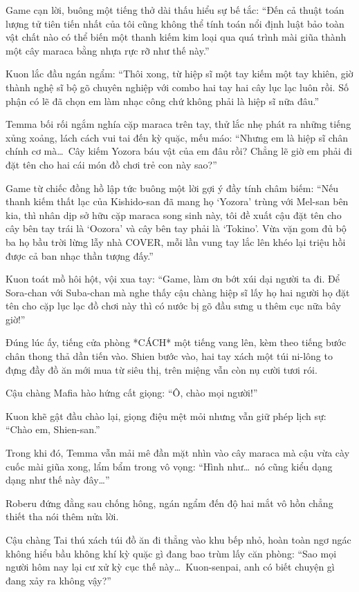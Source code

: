 \documentclass[../main.tex]{subfiles}
\begin{document}
Game cạn lời, buông một tiếng thở dài thấu hiểu sự bế tắc: ``Đến cả thuật toán lượng tử tiên tiến nhất của tôi cũng không thể tính toán nổi định luật bảo toàn vật chất nào có thể biến một thanh kiếm kim loại qua quá trình mài giũa thành một cây maraca bằng nhựa rực rỡ như thế này.''

Kuon lắc đầu ngán ngẩm: ``Thôi xong, từ hiệp sĩ một tay kiếm một tay khiên, giờ thành nghệ sĩ bộ gõ chuyên nghiệp với combo hai tay hai cây lục lạc luôn rồi. Số phận có lẽ đã chọn em làm nhạc công chứ không phải là hiệp sĩ nữa đâu.''

Temma bối rối ngắm nghía cặp maraca trên tay, thử lắc nhẹ phát ra những tiếng xủng xoảng, lách cách vui tai đến kỳ quặc, mếu máo: ``Nhưng em là hiệp sĩ chân chính cơ mà\dots\ Cây kiếm Yozora báu vật của em đâu rồi? Chẳng lẽ giờ em phải đi đặt tên cho hai cái món đồ chơi trẻ con này sao?''

Game từ chiếc đồng hồ lập tức buông một lời gợi ý đầy tính châm biếm: ``Nếu thanh kiếm thất lạc của Kishido-san đã mang họ `Yozora' trùng với Mel-san bên kia, thì nhân dịp sở hữu cặp maraca song sinh này, tôi đề xuất cậu đặt tên cho cây bên tay trái là `Oozora' và cây bên tay phải là `Tokino'. Vừa vặn gom đủ bộ ba họ bầu trời lừng lẫy nhà COVER, mỗi lần vung tay lắc lên khéo lại triệu hồi được cả ban nhạc thần tượng đấy.''

Kuon toát mồ hôi hột, vội xua tay: ``Game, làm ơn bớt xúi dại người ta đi. Để Sora-chan với Suba-chan mà nghe thấy cậu chàng hiệp sĩ lấy họ hai người họ đặt tên cho cặp lục lạc đồ chơi này thì có nước bị gõ đầu sưng u thêm cục nữa bây giờ!''

Đúng lúc ấy, tiếng cửa phòng *CÁCH* một tiếng vang lên, kèm theo tiếng bước chân thong thả dần tiến vào. Shien bước vào, hai tay xách một túi ni-lông to đựng đầy đồ ăn mới mua từ siêu thị, trên miệng vẫn còn nụ cười tươi rói.

Cậu chàng Mafia hào hứng cất giọng: ``Ô, chào mọi người!''

Kuon khẽ gật đầu chào lại, giọng điệu mệt mỏi nhưng vẫn giữ phép lịch sự: ``Chào em, Shien-san.''

Trong khi đó, Temma vẫn mải mê đần mặt nhìn vào cây maraca mà cậu vừa cày cuốc mài giũa xong, lẩm bẩm trong vô vọng: ``Hình như\dots\ nó cũng kiểu dạng dạng như thế này đây\dots''

Roberu đứng đằng sau chống hông, ngán ngẩm đến độ hai mắt vô hồn chẳng thiết tha nói thêm nửa lời.

Cậu chàng Tai thú xách túi đồ ăn đi thẳng vào khu bếp nhỏ, hoàn toàn ngơ ngác không hiểu bầu không khí kỳ quặc gì đang bao trùm lấy căn phòng: ``Sao mọi người hôm nay lại cư xử kỳ cục thế này\dots\ Kuon-senpai, anh có biết chuyện gì đang xảy ra không vậy?''
\end{document}

